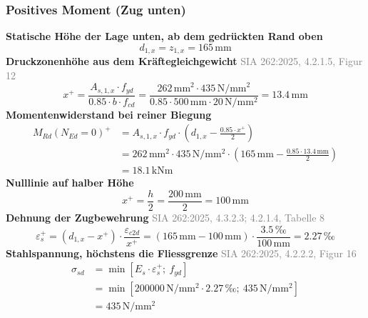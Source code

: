 \documentclass[11pt,a4paper]{article}
\newcommand{\normref}[1]{{\small\textcolor{gray}{#1}}}
\begin{document}
\subsubsection{Positives Moment (Zug unten)}
\noindent\textbf{Statische Höhe der Lage unten, ab dem gedrückten Rand oben}
\begin{equation*}
d_{1,x} = z_{1,x} = 165\,\mathrm{mm}
\end{equation*}
\noindent\textbf{Druckzonenhöhe aus dem Kräftegleichgewicht} \hfill \normref{SIA 262:2025, 4.2.1.5, Figur 12}
\begin{equation*}
x^{+} = \frac{A_{s,1,x} \cdot f_{yd}}{0.85 \cdot b \cdot f_{cd}} = \frac{262\,\mathrm{mm}^{2} \cdot 435\,\mathrm{N}/\mathrm{mm}^{2}}{0.85 \cdot 500\,\mathrm{mm} \cdot 20\,\mathrm{N}/\mathrm{mm}^{2}} = 13.4\,\mathrm{mm}
\end{equation*}
\noindent\textbf{Momentenwiderstand bei reiner Biegung}
\begin{equation*}
\begin{aligned}
  M_{Rd}(N_{Ed}=0)^{+} &= A_{s,1,x} \cdot f_{yd} \cdot \left(d_{1,x} - \frac{0.85 \cdot x^{+}}{2}\right) \\
  &= 262\,\mathrm{mm}^{2} \cdot 435\,\mathrm{N}/\mathrm{mm}^{2} \cdot \left(165\,\mathrm{mm} - \frac{0.85 \cdot 13.4\,\mathrm{mm}}{2}\right) \\
  &= 18.1\,\mathrm{kNm}
\end{aligned}
\end{equation*}
\noindent\textbf{Nulllinie auf halber Höhe}
\begin{equation*}
x^{+} = \frac{h}{2} = \frac{200\,\mathrm{mm}}{2} = 100\,\mathrm{mm}
\end{equation*}
\noindent\textbf{Dehnung der Zugbewehrung} \hfill \normref{SIA 262:2025, 4.3.2.3; 4.2.1.4, Tabelle 8}
\begin{equation*}
\varepsilon_s^{+} = \left(d_{1,x} - x^{+}\right) \cdot \frac{\varepsilon_{c2d}}{x^{+}} = \left(165\,\mathrm{mm} - 100\,\mathrm{mm}\right) \cdot \frac{3.5\,\text{‰}}{100\,\mathrm{mm}} = 2.27\,\text{‰}
\end{equation*}
\noindent\textbf{Stahlspannung, höchstens die Fliessgrenze} \hfill \normref{SIA 262:2025, 4.2.2.2, Figur 16}
\begin{equation*}
\begin{aligned}
  \sigma_{sd} &= \min\left[E_s \cdot \varepsilon_s^{+};\ f_{yd}\right] \\
  &= \min\left[200000\,\mathrm{N}/\mathrm{mm}^{2} \cdot 2.27\,\text{‰};\ 435\,\mathrm{N}/\mathrm{mm}^{2}\right] \\
  &= 435\,\mathrm{N}/\mathrm{mm}^{2}
\end{aligned}
\end{equation*}
\end{document}
